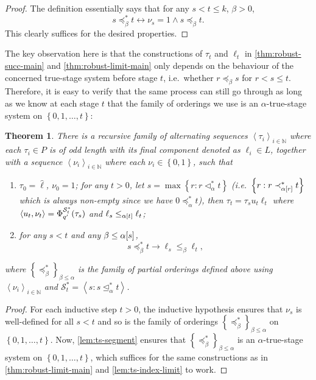 \documentclass[11pt]{article}
\theoremstyle{plain}
\newtheorem{theorem}{Theorem}[section]
\theoremstyle{definition}
\newcommand{\tuple}[1]{\left\langle #1 \right\rangle}
\begin{document}
\begin{proof}
  The definition essentially says that for any $s < t \leq k$, $\beta > 0$,
  \[s \preceq_\beta^* t \longleftrightarrow \nu_s = 1 \land s \preceq_\beta t.\]
  This clearly suffices for the desired properties.
\end{proof}

The key observation here is that the constructions of $\tau_t$ and $\ell_t$ in \autoref{thm:robust-succ-main} and \autoref{thm:robust-limit-main} only depends on the behaviour of the concerned true-stage system before stage $t$, i.e.\ whether $r \preceq_\beta s$ for $r < s \leq t$. Therefore, it is easy to verify that the same process can still go through as long as we know at each stage $t$ that the family of orderings we use is an $\alpha$-true-stage system on $\left\{0, 1, \ldots, t\right\}$:

\begin{theorem}
  \label{thm:gen-main}
  There is a recursive family of alternating sequences $\tuple{\tau_i}_{i \in \mathbb{N}}$ where each $\tau_i \in P$ is of odd length with its final component denoted as $\ell_i \in L$, together with a sequence $\tuple{\nu_i}_{i \in \mathbb{N}}$ where each $\nu_i \in \left\{0, 1\right\}$, such that
  \begin{enumerate}[label=\textnormal{(\alph*)}]
    \item $\tau_0 = \hat{\ell}$, $\nu_0 = 1$; for any $t > 0$, let $s = \max \left\{r : r \lhd_\alpha^* t\right\}$ (i.e.\ $\left\{r : r \prec_{\alpha\mleft[r\mright]}^* t\right\}$ which is always non-empty since we have $0 \preceq_\alpha^* t$), then $\tau_t = \tau_s u_t \ell_t$ where $\tuple{u_t, \nu_t} = \Phi_{q'}^{\mathcal{S}^*_t}\mleft(\tau_s\mright)$ and $\ell_s \leq_{\alpha\mleft[t\mright]} \ell_t$;
    \item for any $s < t$ and any $\beta \leq \alpha\mleft[s\mright]$,
          \[s \preceq_\beta^* t \longrightarrow \ell_s \leq_\beta \ell_t,
            \tag{MC}\]
  \end{enumerate}
  where $\left\{\preceq_\beta^*\right\}_{\beta \leq \alpha}$ is the family of partial orderings defined above using $\tuple{\nu_i}_{i \in \mathbb{N}}$ and $\mathcal{S}^*_t = \tuple{s : s \unlhd_\alpha^* t}$.
\end{theorem}

\begin{proof}
  For each inductive step $t > 0$, the inductive hypothesis ensures that $\nu_s$ is well-defined for all $s < t$ and so is the family of orderings $\left\{\preceq_\beta^*\right\}_{\beta \leq \alpha}$ on $\left\{0, 1, \ldots, t\right\}$. Now, \autoref{lem:ts-segment} ensures that $\left\{\preceq_\beta^*\right\}_{\beta \leq \alpha}$ is an $\alpha$-true-stage system on $\left\{0, 1, \ldots, t\right\}$, which suffices for the same constructions as in \autoref{thm:robust-limit-main} and \autoref{lem:ts-index-limit} to work.
\end{proof}
\end{document}
